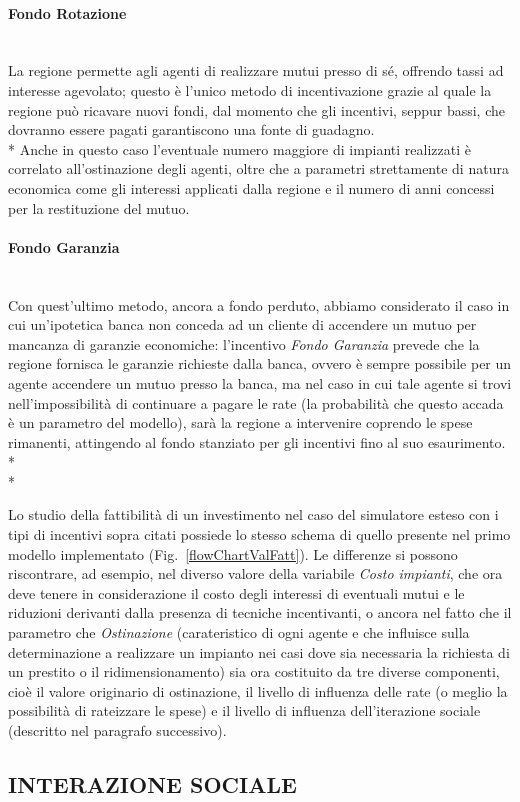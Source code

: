\documentclass[12pt,a4paper,openright,twoside]{report}
\newcommand{\myparagraph}[1]{\paragraph{#1}\mbox{}\\}
\begin{document}
\myparagraph{Fondo Rotazione}

La regione permette agli agenti di realizzare mutui presso di sé, offrendo tassi ad interesse agevolato; questo è l'unico metodo di incentivazione grazie al quale la regione può ricavare nuovi fondi, dal momento che gli incentivi, seppur bassi, che dovranno essere pagati garantiscono una fonte di guadagno.\\*
Anche in questo caso l'eventuale numero maggiore di impianti realizzati è correlato all'ostinazione degli agenti, oltre che a parametri strettamente di natura economica come gli interessi applicati dalla regione e il numero di anni concessi per la restituzione del mutuo.

\myparagraph{Fondo Garanzia}

Con quest'ultimo metodo, ancora a fondo perduto, abbiamo considerato il caso in cui un'ipotetica banca non conceda ad un cliente di accendere un mutuo per mancanza di garanzie economiche: l'incentivo \emph{Fondo Garanzia} prevede che la regione fornisca le garanzie richieste dalla banca, ovvero è sempre possibile per un agente accendere un mutuo presso la banca, ma nel caso in cui tale agente si trovi nell'impossibilità di continuare a pagare le rate (la probabilità che questo accada è un parametro del modello), sarà la regione a intervenire coprendo le spese rimanenti, attingendo al fondo stanziato per gli incentivi fino al suo esaurimento.\\*\\*

Lo studio della fattibilità di un investimento nel caso del simulatore esteso con i tipi di incentivi sopra citati possiede lo stesso schema di quello presente nel primo modello implementato (Fig.~\ref{flowChartValFatt}). Le differenze si possono riscontrare, ad esempio, nel diverso valore della variabile \emph{Costo impianti}, che ora deve tenere in considerazione il costo degli interessi di eventuali mutui e le riduzioni derivanti dalla presenza di tecniche incentivanti, o ancora nel fatto che il parametro che \emph{Ostinazione} (carateristico di ogni agente e che influisce sulla determinazione a realizzare un impianto nei casi dove sia necessaria la richiesta di un prestito o il ridimensionamento) sia ora costituito da tre diverse componenti, cioè il valore originario di ostinazione, il livello di influenza delle rate (o meglio la possibilità di rateizzare le spese) e il livello di influenza dell'iterazione sociale (descritto nel paragrafo successivo).

\subsection{INTERAZIONE SOCIALE}
\end{document}
